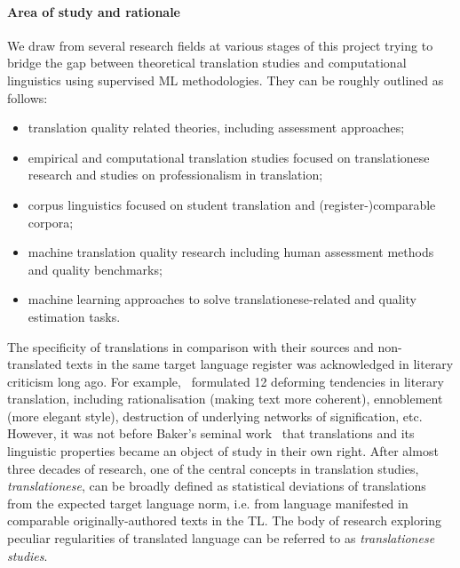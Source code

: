 \paragraph{Area of study and rationale} 

We draw from several research fields at various stages of this project trying to bridge the gap between theoretical translation studies and computational linguistics using supervised \gls{ML} methodologies. They can be roughly outlined as follows:
\begin{itemize}\compresslist{}
	\item translation quality related theories, including assessment approaches;
	\item empirical and computational translation studies focused on translationese research and studies on professionalism in translation;
	\item corpus linguistics focused on student translation and (register-)comparable corpora;
	\item machine translation quality research including human assessment methods and quality benchmarks;
	\item machine learning approaches to solve translationese-related and quality estimation tasks.
\end{itemize}

The specificity of translations in comparison with their sources and non-translated texts in the same target language register was acknowledged in literary criticism long ago. For example,~\citet{Berman1985} formulated 12 deforming tendencies in literary translation, including rationalisation (making text more coherent), ennoblement (more elegant style), destruction of underlying networks of signification, etc. However, it was not before Baker's seminal work~\cite{Baker1993} that translations and its linguistic properties became an object of study in their own right. After almost three decades of research, one of the central concepts in translation studies, \textit{translationese}, can be broadly defined as statistical deviations of translations from the expected target language norm, i.e. from language manifested in comparable originally-authored texts in the \gls{TL}. The body of research exploring peculiar regularities of translated language can be referred to as \textit{translationese studies}. 

